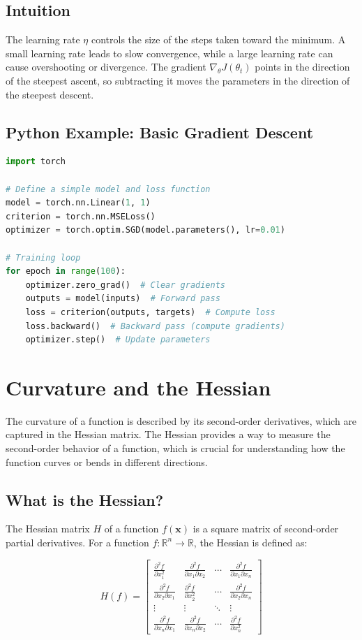 \begin{notechapter}
\subsection{Intuition}
The learning rate \(\eta\) controls the size of the steps 
taken toward the minimum. A small learning rate leads to 
slow convergence, while a large learning rate can cause 
overshooting or divergence. The gradient 
\(\nabla_\theta J(\theta_t)\) points in the direction of 
the steepest ascent, so subtracting it moves the parameters 
in the direction of the steepest descent.

\subsection{Python Example: Basic Gradient Descent}
\begin{lstlisting}[language=Python]
import torch

# Define a simple model and loss function
model = torch.nn.Linear(1, 1)
criterion = torch.nn.MSELoss()
optimizer = torch.optim.SGD(model.parameters(), lr=0.01)

# Training loop
for epoch in range(100):
    optimizer.zero_grad()  # Clear gradients
    outputs = model(inputs)  # Forward pass
    loss = criterion(outputs, targets)  # Compute loss
    loss.backward()  # Backward pass (compute gradients)
    optimizer.step()  # Update parameters
\end{lstlisting}

\section{Curvature and the Hessian}
The curvature of a function is described by its second-order 
derivatives, which are captured in the Hessian matrix. The 
Hessian provides a way to measure the second-order behavior 
of a function, which is crucial for understanding how the 
function curves or bends in different directions.

\subsection{What is the Hessian?}
The Hessian matrix \( H \) of a function \( f(\mathbf{x}) \) 
is a square matrix of second-order partial derivatives. For 
a function \( f: \mathbb{R}^n \rightarrow \mathbb{R} \), the 
Hessian is defined as:

\[
H(f) = \begin{bmatrix}
\frac{\partial^2 f}{\partial x_1^2} & \frac{\partial^2 f}{\partial x_1 \partial x_2} & \cdots & \frac{\partial^2 f}{\partial x_1 \partial x_n} \\
\frac{\partial^2 f}{\partial x_2 \partial x_1} & \frac{\partial^2 f}{\partial x_2^2} & \cdots & \frac{\partial^2 f}{\partial x_2 \partial x_n} \\
\vdots & \vdots & \ddots & \vdots \\
\frac{\partial^2 f}{\partial x_n \partial x_1} & \frac{\partial^2 f}{\partial x_n \partial x_2} & \cdots & \frac{\partial^2 f}{\partial x_n^2}
\end{bmatrix}
\]


\end{notechapter}
